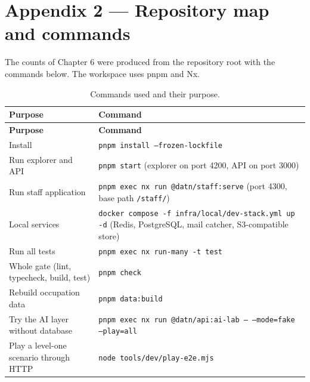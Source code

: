 \newpage
\section*{Appendix 2 --- Repository map and commands}

The counts of Chapter 6 were produced from the repository root with the commands below. The workspace uses pnpm and Nx.

{\small
\begin{longtable}{|>{\raggedright\arraybackslash}p{}|>{\raggedright\arraybackslash}p{}|}
\caption{Commands used and their purpose.} \\
\hline
\textbf{Purpose} & \textbf{Command} \\ \hline
\endfirsthead
\hline
\textbf{Purpose} & \textbf{Command} \\ \hline
\endhead
Install & \texttt{pnpm install --frozen-lockfile} \\ \hline
Run explorer and API & \texttt{pnpm start} (explorer on port 4200, API on port 3000) \\ \hline
Run staff application & \texttt{pnpm exec nx run @datn/staff:serve} (port 4300, base path \texttt{/staff/}) \\ \hline
Local services & \texttt{docker compose -f infra/local/dev-stack.yml up -d} (Redis, PostgreSQL, mail catcher, S3-compatible store) \\ \hline
Run all tests & \texttt{pnpm exec nx run-many -t test} \\ \hline
Whole gate (lint, typecheck, build, test) & \texttt{pnpm check} \\ \hline
Rebuild occupation data & \texttt{pnpm data:build} \\ \hline
Try the AI layer without database & \texttt{pnpm exec nx run @datn/api:ai-lab -- --mode=fake --play=all} \\ \hline
Play a level-one scenario through HTTP & \texttt{node tools/dev/play-e2e.mjs} \\ \hline
\end{longtable}
}

